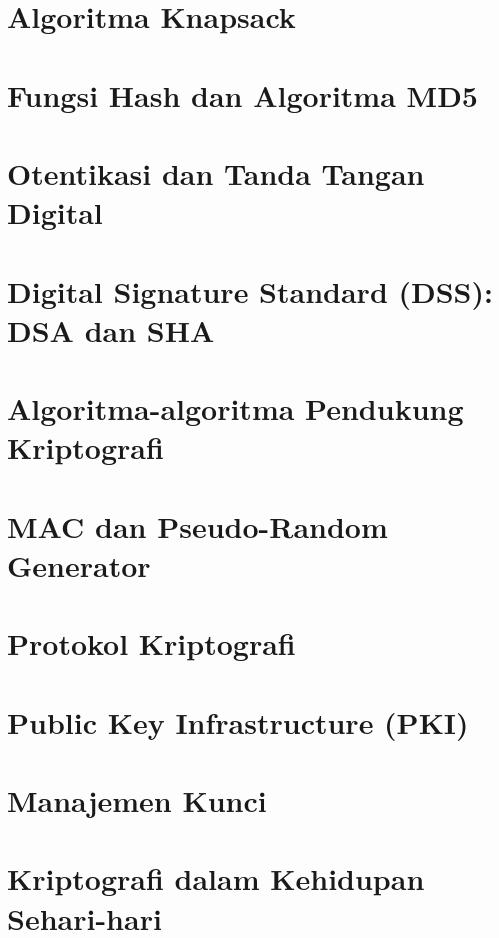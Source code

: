 \documentclass{book}
\begin{document}
\chapter{Algoritma Knapsack}
\chapter{Fungsi Hash dan Algoritma MD5}
\chapter{Otentikasi dan Tanda Tangan Digital}
\chapter{Digital Signature Standard (DSS): DSA dan SHA}
\chapter{Algoritma-algoritma Pendukung Kriptografi}
\chapter{MAC dan Pseudo-Random Generator}
\chapter{Protokol Kriptografi}
\chapter{Public Key Infrastructure (PKI)}
\chapter{Manajemen Kunci}
\chapter{Kriptografi dalam Kehidupan Sehari-hari}
\end{document}
